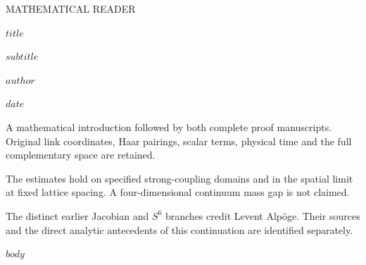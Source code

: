 \documentclass[11pt,a4paper]{article}
\begin{document}
\begin{titlepage}
\vspace*{14mm}
{\sffamily\Large MATHEMATICAL READER\par}
\vspace{12mm}
{\LARGE\bfseries $title$\par}
\vspace{9mm}
{\large $subtitle$\par}
\vspace{13mm}
{\large $author$\par}
\vspace{3mm}
{$date$\par}
\vfill
\begin{minipage}{0.96\textwidth}
A mathematical introduction followed by both complete proof manuscripts. Original link coordinates, Haar pairings, scalar terms, physical time and the full complementary space are retained.

\medskip
The estimates hold on specified strong-coupling domains and in the spatial limit at fixed lattice spacing. A four-dimensional continuum mass gap is not claimed.

\medskip
The distinct earlier Jacobian and \(S^6\) branches credit Levent Alpöge. Their sources and the direct analytic antecedents of this continuation are identified separately.
\end{minipage}
\vspace{10mm}
\end{titlepage}
\tableofcontents
\clearpage
{}
$body$
\end{document}
